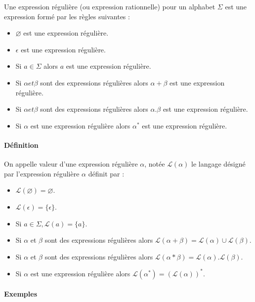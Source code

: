 Une expression régulière (ou expression rationnelle) pour un alphabet $\Sigma$ est une expression formé par les règles suivantes :

\begin{itemize}
	\item $\varnothing$ est une expression régulière.
	\item $\epsilon$ est une expression régulière.
	\item Si $a \in \Sigma$ alors $a$ est une expression régulière.
	\item Si $\alpha et \beta$ sont des expressions régulières alors $\alpha + \beta$ est une expression régulière.
	\item Si $\alpha et \beta$ sont des expressions régulières alors $\alpha . \beta$ est une expression régulière.
	\item Si $\alpha$ est une expression régulière alors $\alpha^*$ est une expression régulière.
\end{itemize}



\paragraph{Définition} %
\label{par:d_finition}

On appelle valeur d'une expression régulière $\alpha$, notée $\mathcal{L}(\alpha)$ le langage désigné par l'expression régulière $\alpha$ définit par :

\begin{itemize}
	\item $\mathcal{L}(\varnothing)=\varnothing$.
	\item $\mathcal{L}(\epsilon)=\{\epsilon\}$.
	\item Si $a \in \Sigma, \mathcal{L}(a)=\{a\}$.
	\item Si $\alpha$ et $\beta$ sont des expressions régulières alors $\mathcal{L}(\alpha + \beta)=\mathcal{L}(\alpha) \cup \mathcal{L}(\beta)$.
	\item Si $\alpha$ et $\beta$ sont des expressions régulières alors $\mathcal{L}(\alpha * \beta)=\mathcal{L}(\alpha) . \mathcal{L}(\beta)$.
	\item Si $\alpha$ est une expression régulière alors $\mathcal{L}(\alpha^*)=(\mathcal{L}(\alpha))^*$.
\end{itemize}



\paragraph{Exemples} %
\label{par:exemples}

